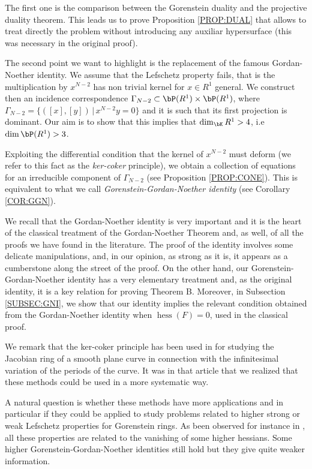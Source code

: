 \documentclass[a4paper,11pt]{amsart}
\DeclareMathOperator{\hess}{hess}
\begin{document}
The first one is the comparison between the Gorenstein duality and the projective duality theorem. This leads us to prove Proposition \ref{PROP:DUAL} that allows to treat directly the problem without introducing any auxiliar hypersurface (this was necessary in the original proof).
\medskip

The second point we want to highlight is the replacement of the famous Gordan-Noether identity. We assume that the Lefschetz property fails, that is the multiplication
by $x^{N-2}$ has non trivial kernel for $x\in R^1$ general. We construct then an incidence correspondence $\Gamma_{N-2}\subset \bP(R^1)\times \bP(R^1)$, where $\Gamma_{N-2}=\{([x],[y])\,|\, x^{N-2}y=0\}$ and it is such that its first projection is dominant. Our aim is to show that this implies that $\dim_{\bK}R^1>4$, i.e $\dim \bP(R^1)>3$.

Exploiting the differential condition that the kernel of $x^{N-2}$
must deform (we refer to this fact as the \emph{ker-coker} principle), we obtain a collection of equations for an irreducible component of $\Gamma_{N-2}$ (see Proposition \ref{PROP:CONE}). This is equivalent to what we call \emph{Gorenstein-Gordan-Noether identity} (see Corollary \ref{COR:GGN}).
\medskip

We recall that the Gordan-Noether identity is very important and it is the heart of the classical treatment of the Gordan-Noether Theorem and, as well, of all the proofs we have found in the literature.  The proof of the identity involves some delicate manipulations, and, in our opinion, as strong as it is, it appears as a cumberstone along the street of the proof. On the other hand, our Gorenstein-Gordan-Noether identity has a very elementary treatment and, as the original identity, it is a key relation for proving Theorem B. Moreover, in Subsection \ref{SUBSEC:GNI}, we show that our identity implies the relevant condition obtained from the Gordan-Noether identity when $\hess(F)=0$, used in the classical proof. 
\vspace{2mm}

We remark that the ker-coker principle has been used in \cite{FP21} for studying the Jacobian ring of a smooth plane curve in connection with the infinitesimal variation of the periods of the curve. It was in that article that we realized that these methods could be used in a more systematic way.
\bigskip

A natural question is whether these methods have more applications and in particular if they could be applied to study problems related to higher strong or weak Lefschetz properties for Gorenstein rings. As been observed for instance in \cites{MW09,Gon17}, all these properties are related to the vanishing of some higher hessians. Some higher Gorenstein-Gordan-Noether identities still hold but they give quite weaker information. 
\vspace{2mm}
\end{document}
